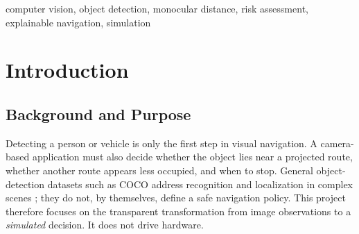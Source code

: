 \documentclass[conference,10pt]{IEEEtran}
\begin{document}
\begin{abstract}
Camera-based object detection identifies obstacles but does not directly explain how a navigation system should respond. This project develops a software-only patrol simulator that converts webcam or video frames into an inspectable straight, turn, or stop recommendation. The current prototype combines an optional Ultralytics YOLO11n detector, a class-aware intersection-over-union tracker, horizontal navigation zones, an image-space collision corridor, approximate monocular distance bands, per-object risk scores, and left/right corridor aggregation. A PySide6 dashboard presents annotated frames, the selected action and reason, steering angle, simulated wheel speeds, risk map, and telemetry. The implementation is modular and configurable through YAML. Initial verification on 3 October 2026 found that all six headless navigation tests pass; the installed model loads on CPU; and the 24-second synthetic demonstration video yields no YOLO detections at five sampled times. Controlled injected-detection scenes nevertheless exercise the downstream turn and stop logic and are labeled as such. These results establish a working decision prototype, not detection accuracy or safe autonomous operation. Before the 4 October 2026 submission, the remaining work is to run a small real-footage check, document observed inference behavior and limitations, verify the final demonstration, and package the code and report. Future improvements include camera calibration, stronger tracking, and consistency fixes for corridor display and stop handling.
\end{abstract}
\begin{IEEEkeywords}
computer vision, object detection, monocular distance, risk assessment, explainable navigation, simulation
\end{IEEEkeywords}

\section{Introduction}
\subsection{Background and Purpose}
Detecting a person or vehicle is only the first step in visual navigation. A camera-based application must also decide whether the object lies near a projected route, whether another route appears less occupied, and when to stop. General object-detection datasets such as COCO address recognition and localization in complex scenes \cite{coco}; they do not, by themselves, define a safe navigation policy. This project therefore focuses on the transparent transformation from image observations to a \emph{simulated} decision. It does not drive hardware.
\end{document}
